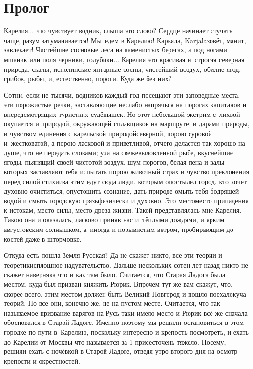 {
\cleardoublepage
{}

\fancyhead[LE]{\fancyplain{}{}}
\fancyhead[RO]{\fancyplain{}{}}

\section*{Пролог}

Карелия$\ldots$ что чувствует водник, слыша это слово? Сердце начинает стучать чаще, разум затуманивается! Мы~едем в Карелию! Карьяла, Karjala\mdash зовёт, манит, завлекает! Чистейшие сосновые леса на каменистых берегах, а под ногами мшаник или поля черники, голубики$\ldots$ Карелия это красивая и~строгая северная природа, скалы, исполинские янтарные сосны, чистейший воздух, обилие ягод, грибов, рыбы, и, естественно, пороги. Куда же без них? 

Сотни, если не тысячи, водников каждый год посещают эти заповедные места, эти порожистые речки, заставляющие неслабо напрячься на порогах капитанов и впередсмотрящих туристких судёнышек. Но этот небольшой экстрим с~лихвой окупается и природой, окружающей сплавщиков на маршруте, и дарами природы, и чувством единения с карельской природой\mdash северной, порою суровой и~жестковатой, а порою ласковой и приветливой, отчего делается так хорошо на душе, что не передать словами; уха на свежевыловленной рыбе, вкуснейшие ягоды, пьянящий своей чистотой воздух, шум порогов, белая пена и валы которых заставляют тебя испытать порою животный страх и чувство преклонения перед силой стихии\mdash за этим едут сюда люди, которым опостылел город, кто хочет духовно очиститься, опустошить сознание, дать природе омыть тебя бодрящей водой и смыть городскую грязь\mdash физически и духовно. Это место\mdash место припадения к истокам, место силы, место древа жизни. Такой представлялась мне Карелия. Такою она и оказалась, ласково приняв нас и~тёплыми дождями, и ярким августовским солнышком, а~иногда и порывистым ветром, пробирающим до костей даже в штормовке.  

Откуда есть пошла Земля Русская? Да не скажет никто, все эти теории и теоретики\mdash сплошное надувательство. Дальше нескольких сотен лет назад никто не скажет наверняка что и как там было. Считается, что Старая Ладога была местом, куда был призван княжить Рюрик. Впрочем тут же вам скажут, что, скорее всего, этим местом должен быть Великий Новгород и пошло поехало\mdash куча теорий. Но все они, конечно же, не на пустом месте. Считается, что так называемое призвание варягов на Русь таки имело место и Рюрик всё же сначала обосновался в Старой Ладоге. Именно поэтому мы решили остановиться в этом городке по пути в~Карелию, поскольку интересно и крепость посмотреть, и ехать до Карелии от Москвы что называется за 1 присест\mdash очень тяжело. Посему, решили ехать с ночёвкой в Старой Ладоге, отведя утро второго дня на осмотр крепости и окрестностей. 

}
